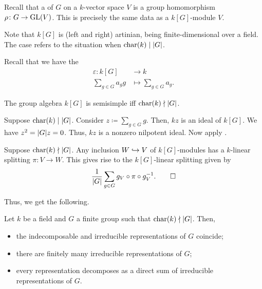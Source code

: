 \documentclass[12pt]{article}
\begin{document}
Recall that a  of $G$ on a $k$-vector space $V$ is a group homomorphism $\rho \colon G \to \operatorname{GL}(V)$. 
This is precisely the same data as a $k[G]$-module $V$. 

Note that $k[G]$ is (left and right) artinian, being finite-dimensional over a field. 
The  case refers to the situation when $\operatorname{char}(k) \mid {\left\lvert G \right\lvert}$.

Recall that we have the 
\begin{align*} 
	\varepsilon \colon k[G] & \to k \\
	\sum_{g \in G} a_{g} g & \mapsto \sum_{g \in G} a_{g}.
\end{align*}

\begin{thm}
	The group algebra $k[G]$ is semisimple iff $\operatorname{char}(k) \nmid {\left\lvert G \right\lvert}$.
\end{thm}
\begin{sketch}
	\forward Suppose $\operatorname{char}(k) \mid {\left\lvert G \right\lvert}$. 
	Consider $z \coloneqq \sum_{g \in G} g$. 
	Then, $kz$ is an ideal of $k[G]$. 
	We have $z^{2} = {\left\lvert G \right\lvert}z = 0$. 
	Thus, $kz$ is a nonzero nilpotent ideal. 
	Now apply .

	\backward Suppose $\operatorname{char}(k) \nmid {\left\lvert G \right\lvert}$. 
	Any inclusion $W \hookrightarrow V$ of $k[G]$-modules has a $k$-linear splitting $\pi \colon V \to W$. 
	This gives rise to the $k[G]$-linear splitting given by 
	\begin{equation*} 
		\frac{1}{{\left\lvert G \right\lvert}} \sum_{g \in G} g_{V} \circ \pi \circ g_{V}^{-1}. \qedhere
	\end{equation*}
\end{sketch}

Thus, we get the following.
\begin{thm}
	Let $k$ be a field and $G$ a finite group such that $\operatorname{char}(k) \nmid {\left\lvert G \right\lvert}$. 
	Then, 
	\begin{itemize}
		\item the indecomposable and irreducible representations of $G$ coincide;
		\item there are finitely many irreducible representations of $G$;
		\item every representation decomposes as a direct sum of irreducible representations of $G$.
	\end{itemize}
\end{thm}
\end{document}
